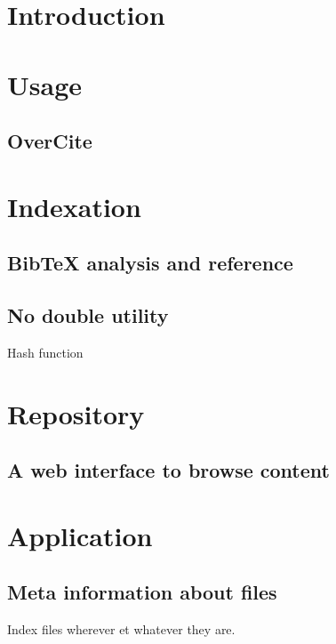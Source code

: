 \section{Introduction}

\section{Usage}

\subsection{OverCite}

\section{Indexation}


\subsection{Bib\TeX{} analysis and reference}

\subsection{No double utility}

Hash function

\section{Repository}

\subsection{A web interface to browse content}

\section{Application}

\subsection{Meta information about files}

Index files wherever et whatever they are.
